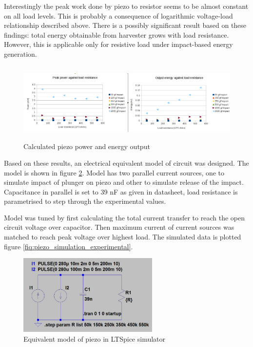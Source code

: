  Interestingly the peak work done by piezo to resistor seems to be almost constant on all load levels. This is probably a consequence of logarithmic voltage-load relationship described above. There is a possibly significant result based on these findings: total energy obtainable from harvester grows with load resistance. However, this is applicable only for resistive load under impact-based energy generation.
 
 \begin{figure}[htb]
  \begin{center}
  \includegraphics[height=4cm]{images/own_measurement/piezo_power}
  \end{center}
  \caption{Calculated piezo power and energy output}
  \label{fig:piezo_power_energy}
\end{figure}

Based on these results, an electrical equivalent model of circuit was designed. The model is shown in figure \ref{fig:piezo_ltspice_equivalent}. Model has two parallel current sources, one to simulate impact of plunger on piezo and other to simulate release of the impact. Capacitance in parallel is set to 39 nF as given in datasheet, load resistance is parametrised to step through the experimental values. 

Model was tuned by first calculating the total current transfer to reach the open circuit voltage over capacitor. Then maximum current of current sources was matched to reach peak voltage over highest load.
The simulated data is plotted figure \ref{fiq:piezo_simulation_experimental}.

 \begin{figure}[htb]
  \begin{center}
  \includegraphics[height=4cm]{images/own_dwg/ltspice_piezo}
  \end{center}
  \caption{Equivalent model of piezo in LTSpice simulator}
  \label{fig:piezo_ltspice_equivalent}
\end{figure}

